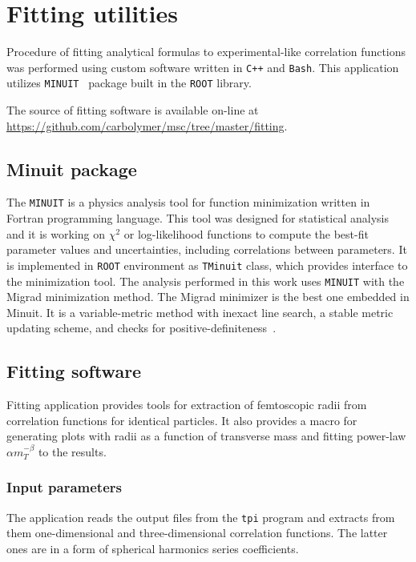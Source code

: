 %
\chapter{Fitting utilities}
\label{a:b}
  Procedure of fitting analytical formulas to experimental-like correlation functions was performed using custom software written in \verb|C++| and \verb|Bash|.
  This application utilizes \verb|MINUIT|~\cite{minuit} package built in the \verb|ROOT| library.

  The source of fitting software is available on-line at \url{https://github.com/carbolymer/msc/tree/master/fitting}.
  \section{Minuit package}
    The \verb|MINUIT| is a physics analysis tool for function minimization written in Fortran programming language.
    This tool was designed for statistical analysis and it is working on $\chi^2$ or log-likelihood functions to compute the best-fit parameter values and uncertainties, including correlations between parameters.
    It is implemented in \verb|ROOT| environment as \verb|TMinuit| class, which provides interface to the minimization tool.
    The analysis performed in this work uses \verb|MINUIT| with the Migrad minimization method.
    The Migrad minimizer is the best one embedded in Minuit.
    It is a variable-metric method with inexact line search, a stable metric updating scheme, and checks for positive-definiteness~\cite{minuit}.
  \section{Fitting software}
    Fitting application provides tools for extraction of femtoscopic radii from correlation functions for identical particles.
    It also provides a macro for generating plots with radii as a function of transverse mass and fitting power-law $\alpha m_T^{-\beta}$ to the results.
    \subsection{Input parameters}
      The application reads the output files from the \verb|tpi| program and extracts from them one-dimensional and three-dimensional correlation functions.
      The latter ones are in a form of spherical harmonics series coefficients.

